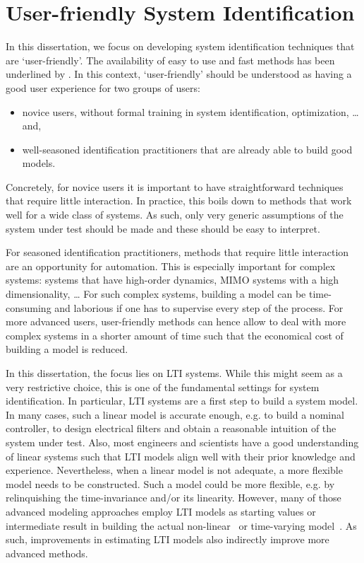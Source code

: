 \section{User-friendly System Identification}
In this dissertation, we focus on developing system identification techniques that are `user-friendly'.
The availability of easy to use and fast methods has been underlined by \citet{Gevers2011Challenges}.
In this context, `user-friendly' should be understood as having a good user experience for two groups of users:
\begin{itemize}
  \item novice users, without formal training in system identification, optimization, \ldots and,
  \item well-seasoned identification practitioners that are already able to build good models.
\end{itemize}
Concretely, for novice users it is important to have straightforward techniques that require little interaction.
In practice, this boils down to methods that work well for a wide class of systems.
As such, only very generic assumptions of the system under test should be made and these should be easy to interpret.

For seasoned identification practitioners, methods that require little interaction are an opportunity for automation.
This is especially important for complex systems: systems that have high-order dynamics, \gls{MIMO} systems with a high dimensionality, \ldots
For such complex systems, building a model can be time-consuming and laborious if one has to supervise every step of the process.
For more advanced users, user-friendly methods can hence allow to deal with more complex systems in a shorter amount of time such that the economical cost of building a model is reduced.

In this dissertation, the focus lies on \gls{LTI} systems.
While this might seem as a very restrictive choice, this is one of the fundamental settings for system identification.
In particular, \gls{LTI} systems are a first step to build a system model.
In many cases, such a linear model is accurate enough, e.g. to build a nominal controller, to design electrical filters and obtain a reasonable intuition of the system under test.
Also, most engineers and scientists have a good understanding of linear systems such that \gls{LTI} models align well with their prior knowledge and experience.
Nevertheless, when a linear model is not adequate, a more flexible model needs to be constructed.
Such a model could be more flexible, e.g. by relinquishing the time-invariance and/or its linearity.
However, many of those advanced modeling approaches employ \gls{LTI} models as starting values or intermediate result in building the actual non-linear~\citep{Giri2010} or time-varying model~\citep{Lataire2012,Louarroudi2014}.
As such, improvements in estimating \gls{LTI} models also indirectly improve more advanced methods.

